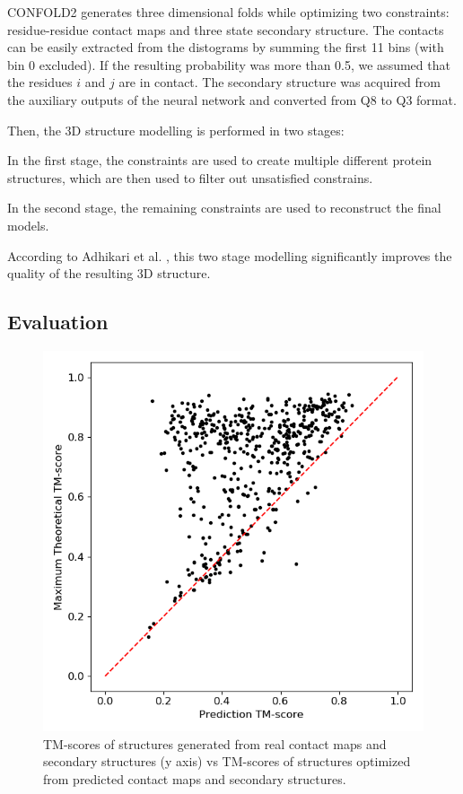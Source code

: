 CONFOLD2 generates three dimensional folds while optimizing two constraints: residue-residue contact maps and three state secondary structure.
The contacts can be easily extracted from the distograms by summing the first 11 bins (with bin 0 excluded).
If the resulting probability was more than 0.5, we assumed that the residues $i$ and $j$ are in contact.
The secondary structure was acquired from the auxiliary outputs of the neural network and converted from Q8 to Q3 format.

Then, the 3D structure modelling is performed in two stages:

In the first stage, the constraints are used to create multiple different protein structures, which are then used to filter out unsatisfied constrains.

In the second stage, the remaining constraints are used to reconstruct the final models.

According to Adhikari et al. \cite{confold}, this two stage modelling significantly improves the quality of the resulting 3D structure.

\subsection{Evaluation}

\begin{figure}
    \centering
    \includegraphics[width=0.6\linewidth]{imgs_tomas/test_tmscore.png}
    \caption{TM-scores of structures generated from real contact maps and secondary structures (y axis) vs TM-scores of structures optimized from predicted contact maps and secondary structures.}
    \label{fig:test_tmscore}
\end{figure}

